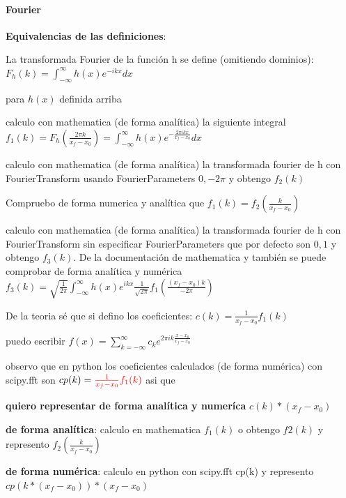 \documentclass{article}
\begin{document}
\paragraph{Fourier}
\textbf{Equivalencias de las definiciones}:

\begin{description}
\item La transformada Fourier de la función h se define  (omitiendo dominios):
$F_h(k) = \int_{- \infty}^{\infty}{h(x) e^{-i k x} dx } $
 
\item para $h(x)$ definida arriba

\item calculo con mathematica (de forma analítica) la siguiente integral
$f_1(k)=F_h(\frac{2\pi k}{x_f - x_0} ) = \int_{- \infty}^{\infty}{h(x) e^{-\frac{2 \pi i k x }{x_f - x_0}} dx } $

\item calculo con mathematica (de forma analítica) la transformada fourier de h con FourierTransform usando FourierParameters $0, -2\pi$  y obtengo $f_2(k)$
\item Compruebo de forma numerica y analítica que
$f_1(k) = f_2(\frac{k}{x_f - x_0})$

\item \color{red}calculo con mathematica (de forma analítica) la transformada fourier de h con FourierTransform sin especificar FourierParameters que por defecto son  $0, 1$  y obtengo $f_3(k)$. De la documentación de mathematica y también se puede comprobar de forma analítica y numérica $f_3(k) = \sqrt{\frac{1}{2 \pi}} \int_{- \infty}^{\infty}{h(x) e^{i k x}}\frac{1}{\sqrt{2 \pi}} f_1(\frac{(x_f - x_0)k}{-2 \pi})$ 
\color{black}

\item De la teoria sé que si defino los coeficientes: $c(k) = \frac{1}{x_f - x_0} f_1(k) $
\item  puedo escribir $f(x) = \sum_{k=-\infty}^{\infty} c_k e^{2 \pi i k \frac{x-x_0}{x_f - x_0}}$
\item observo que en python los coeficientes calculados (de forma numérica) con scipy.fft son $cp(k) = \color{red}\frac{1}{x_f - x_0}  f_1(k)$ \color{black} asi que 

\item \textbf{quiero representar de forma analítica y numeríca} $c(k) * (x_f-x_0)$
\item \textbf{de forma analítica}: calculo en mathematica $f_1(k)$ o obtengo $f2(k)$ y represento  $f_2(\frac{k}{x_f - x_0})$
\item \textbf{de forma numérica}: calculo en python con scipy.fft cp(k) y  represento $cp(k* (x_f - x_0))* (x_f - x_0)$  

\end{description}
\end{document}

